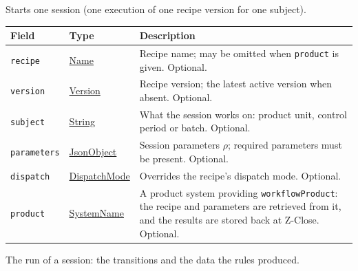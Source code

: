 \documentclass[a4paper]{arrowhead}
\newcommand{\mref}[1]{{\textcolor{ArrowheadPurple}{\hyperref[sec:model:#1]{#1}}}}
\newcommand{\pref}[1]{{\textcolor{ArrowheadGrey}{\hyperref[sec:model:primitives:#1]{#1}}}}
\begin{document}
Starts one session (one execution of one recipe version for one subject).

{\small
\begin{longtable}{|p{3.9cm}|p{4.4cm}|p{7.5cm}|}

\hline
\rowcolor{gray!33} Field & Type & Description \\ \hline
\endhead
\texttt{recipe} & \pref{Name} & Recipe name; may be omitted when \texttt{product} is given. Optional. \\ \hline
\texttt{version} & \pref{Version} & Recipe version; the latest active version when absent. Optional. \\ \hline
\texttt{subject} & \pref{String} & What the session works on: product unit, control period or batch. Optional. \\ \hline
\texttt{parameters} & \pref{JsonObject} & Session parameters $\rho$; required parameters must be present. Optional. \\ \hline
\texttt{dispatch} & \mref{DispatchMode} & Overrides the recipe's dispatch mode. Optional. \\ \hline
\texttt{product} & \pref{SystemName} & A product system providing \texttt{workflow\allowbreak{}Product}: the recipe and parameters are retrieved from it, and the results are stored back at Z-Close. Optional. \\ \hline
\end{longtable}
}

The run of a session: the transitions and the data the rules produced.
\end{document}
